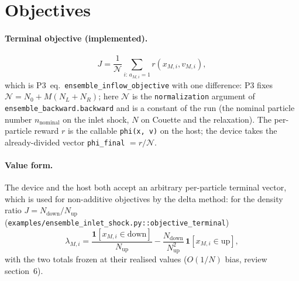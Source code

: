 \documentclass[11pt,a4paper]{article}
\numberwithin{equation}{section}
\newcommand{\ind}{\mathbf{1}}
\newcommand{\code}[1]{\texttt{#1}}
\newcommand{\Nn}{\mathcal{N}}
\newcommand{\pref}[1]{P3~eq.~\code{#1}}
\begin{document}
\section{Objectives}
\label{sec:objective}

\paragraph{Terminal objective (implemented).}
\begin{equation}
\label{eq:objective}
J = \frac{1}{\Nn} \sum_{i:\, a_{M,i} = 1} r(x_{M,i}, v_{M,i}),
\end{equation}
which is \pref{ensemble\_inflow\_objective} with one difference: P3 fixes
$\Nn = N_0 + M(N_L + N_R)$; here $\Nn$ is the \code{normalization} argument of
\code{ensemble\_backward.backward} and is a constant of the run (the nominal particle
number $n_{\mathrm{nominal}}$ on the inlet shock, $N$ on Couette and the relaxation).
The per-particle reward $r$ is the callable \code{phi(x, v)} on the host; the device
takes the already-divided vector \code{phi\_final} $= r/\Nn$.

\paragraph{Value form.}
The device and the host both accept an arbitrary per-particle terminal vector, which
is used for non-additive objectives by the delta method: for the density ratio
$J = N_{\mathrm{down}}/N_{\mathrm{up}}$ (\code{examples/ensemble\_inlet\_shock.py::objective\_terminal})
\begin{equation}
\label{eq:delta-method}
\lambda_{M,i} = \frac{\ind[x_{M,i} \in \text{down}]}{N_{\mathrm{up}}}
 - \frac{N_{\mathrm{down}}}{N_{\mathrm{up}}^2}\,\ind[x_{M,i} \in \text{up}],
\end{equation}
with the two totals frozen at their realised values ($O(1/N)$ bias, review section~6).
\end{document}
